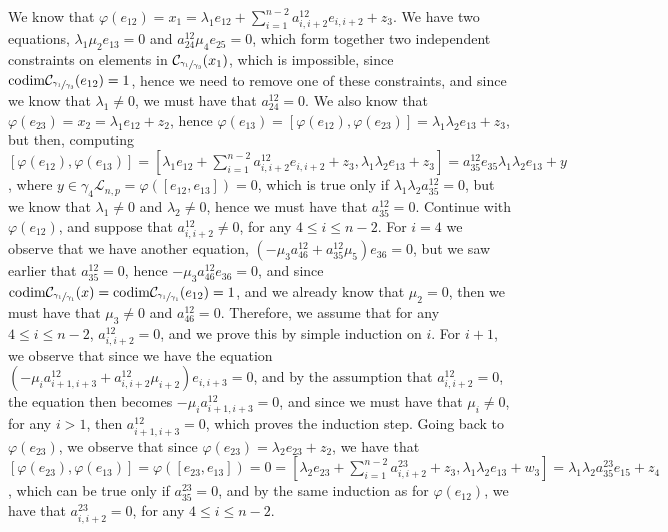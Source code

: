 \documentclass[12pt]{article}
\begin{document}
We know that $\varphi(e_{12})=x_1=\lambda_1 e_{12}+\sum_{i=1}^{n-2}a_{i,i+2}^{12}e_{i,i+2}+z_3$. We have two equations, $\lambda_1\mu_2 e_{13}=0$ and $a_{24}^{12}\mu_4 e_{25}=0$, which form together two independent constraints on elements in $\mathcal{C}_{\sfrac{\gamma_1}{\gamma_3}}(x_1)$, which is impossible, since $\mathrm{codim}\mathcal{C}_{\sfrac{\gamma_1}{\gamma_3}}(e_{12})=1$, hence we need to remove one of these constraints, and since we know that $\lambda_1\neq 0$, we must have that $a_{24}^{12}=0$. We also know that $\varphi(e_{23})=x_2=\lambda_1 e_{12}+z_2$, hence $\varphi(e_{13})=[\varphi(e_{12}),\varphi(e_{23})]=\lambda_1\lambda_2 e_{13}+z_3$, but then, computing $[\varphi(e_{12}),\varphi(e_{13})]=[\lambda_1 e_{12}+\sum_{i=1}^{n-2}a_{i,i+2}^{12}e_{i,i+2}+z_3,\lambda_1\lambda_2 e_{13}+z_3]=a_{35}^{12}e_{35}\lambda_1\lambda_2 e_{13}+y$, where $y\in\gamma_4\mathcal{L}_{n,p}=\varphi([e_{12},e_{13}])=0$, which is true only if $\lambda_1\lambda_2 a_{35}^{12}=0$, but we know that $\lambda_1\neq 0$ and $\lambda_2\neq 0$, hence we must have that $a_{35}^{12}=0$. Continue with $\varphi(e_{12})$, and suppose that $a_{i,i+2}^{12}\neq 0$, for any $4\leq i\leq n-2$. For $i=4$ we observe that we have another equation, $(-\mu_3 a_{46}^{12}+a_{35}^{12}\mu_5)e_{36}=0$, but we saw earlier that $a_{35}^{12}=0$, hence $-\mu_3 a_{46}^{12}e_{36}=0$, and since $\mathrm{codim}\mathcal{C}_{\sfrac{\gamma_1}{\gamma_1}}(x)=\mathrm{codim}\mathcal{C}_{\sfrac{\gamma_1}{\gamma_1}}(e_{12})=1$, and we already know that $\mu_2=0$, then we must have that $\mu_3\neq 0$ and $a_{46}^{12}=0$. Therefore, we assume that for any $4\leq i\leq n-2$, $a_{i,i+2}^{12}=0$, and we prove this by simple induction on $i$. For $i+1$, we observe that since we have the equation $(-\mu_i a_{i+1,i+3}^{12}+a_{i,i+2}^{12}\mu_{i+2})e_{i,i+3}=0$, and by the assumption that $a_{i,i+2}^{12}=0$, the equation then becomes $-\mu_i a_{i+1,i+3}^{12}=0$, and since we must have that $\mu_i\neq 0$, for any $i>1$, then $a_{i+1,i+3}^{12}=0$, which proves the induction step. Going back to $\varphi(e_{23})$, we observe that since $\varphi(e_{23})=\lambda_2 e_{23}+z_2$, we have that $[\varphi(e_{23}),\varphi(e_{13})]=\varphi([e_{23},e_{13}])=0=[\lambda_2 e_{23}+\sum_{i=1}^{n-2}a_{i,i+2}^{23}+z_3,\lambda_1\lambda_2 e_{13}+w_3]=\lambda_1\lambda_2 a_{35}^{23}e_{15}+z_4$, which can be true only if $a_{35}^{23}=0$, and by the same induction as for $\varphi(e_{12})$, we have that $a_{i,i+2}^{23}=0$, for any $4\leq i\leq n-2$. 
\end{document}

